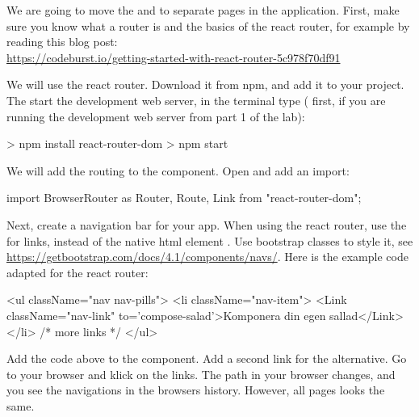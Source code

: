 \documentclass[fleqn, article, a4paper]{memoir}
\begin{document}
\begin{Assignments}

\item We are going to move the  and  to separate pages in the application. First, make sure you know what a router is and the basics of the react router, for example by reading this blog post: 
\\ \url{https://codeburst.io/getting-started-with-react-router-5c978f70df91}

\item We will use the react router. Download it from npm, and add it to your project. The start the development web server, in the terminal type ( first, if you are running the development web server from part 1 of the lab):
\begin{Code}
> npm install react-router-dom
> npm start
\end{Code}

\item We will add the routing to the  component. Open  and add an import:
\begin{Code}
import { BrowserRouter as Router, Route, Link } from "react-router-dom";
\end{Code}

\item Next, create a navigation bar for your app. When using the react router, use the  for links, instead of the native html element . Use bootstrap classes to style it, see \url{https://getbootstrap.com/docs/4.1/components/navs/}. Here is the example code adapted for the react router:
\begin{Code}
<ul className="nav nav-pills">
  <li className="nav-item">
    <Link className="nav-link" to='compose-salad'>Komponera din egen sallad</Link>
  </li>
  {/* more links */}
</ul>
\end{Code}
Add the code above to the  component. Add a second link for the  alternative. Go to your browser and klick on the links. The path in your browser changes, and you see the navigations in the browsers history. However, all pages looks the same.


\end{Assignments}
\end{document}
